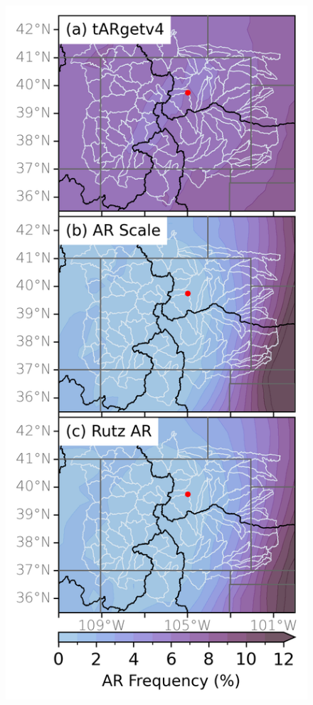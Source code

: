 \documentclass[draft]{agujournal2019}
\begin{document}
\begin{figure}
\noindent\includegraphics[width=\textwidth]{fig2.png}

\end{figure}
\end{document}
